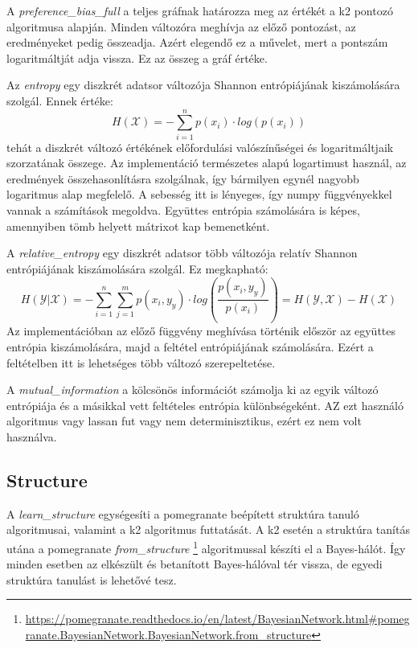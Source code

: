 A \emph{preference\_bias\_full} a teljes gráfnak határozza meg az értékét a k2 pontozó algoritmusa alapján. Minden változóra meghívja az előző pontozást, az eredményeket pedig összeadja. Azért elegendő ez a művelet, mert a pontszám logaritmáltját adja vissza. Ez az összeg a gráf értéke.

Az \emph{entropy} egy diszkrét adatsor változója Shannon entrópiájának kiszámolására szolgál. Ennek értéke:
$$ H(\mathcal{X}) = -\sum_{i = 1}^{n} p(x_{i}) \cdot log(p(x_{i}))$$
tehát a diszkrét változó értékének előfordulási valószínűségei és logaritmáltjaik szorzatának összege. Az implementáció természetes alapú logartimust használ, az eredmények összehasonlításra szolgálnak, így bármilyen egynél nagyobb logaritmus alap megfelelő. A sebesség itt is lényeges, így numpy függvényekkel vannak a számítások megoldva. Együttes entrópia számolására is képes, amennyiben tömb helyett mátrixot kap bemenetként.

A \emph{relative\_entropy} egy diszkrét adatsor több változója relatív Shannon entrópiájának kiszámolására szolgál. Ez megkapható:
$$ H(\mathcal{Y} | \mathcal{X}) = -\sum_{i = 1}^{n}\sum_{j = 1}^{m} p(x_{i}, y_{y}) \cdot log(\frac{p(x_{i}, y_{y})}{p(x_{i})})
= H(\mathcal{Y}, \mathcal{X}) - H(\mathcal{X})$$
Az implementációban az előző függvény meghívása történik először az együttes entrópia kiszámolására, majd a feltétel entrópiájának számolására. Ezért a feltételben itt is lehetséges több változó szerepeltetése.

A \emph{mutual\_information} a kölcsönös információt számolja ki az egyik változó entrópiája és a másikkal vett feltételes entrópia különbségeként. AZ ezt használó algoritmus vagy lassan fut vagy nem determinisztikus, ezért ez nem volt használva.

\subsection{Structure}
A \emph{learn\_structure} egységesíti a pomegranate beépített struktúra tanuló algoritmusai, valamint a k2 algoritmus futtatását. A k2 esetén a struktúra tanítás utána a pomegranate \emph{from\_structure} \footnote{\url{https://pomegranate.readthedocs.io/en/latest/BayesianNetwork.html\#pomegranate.BayesianNetwork.BayesianNetwork.from\_structure}} algoritmussal készíti el a Bayes-hálót. Így minden esetben az elkészült és betanított Bayes-hálóval tér vissza, de egyedi struktúra tanulást is lehetővé tesz.

